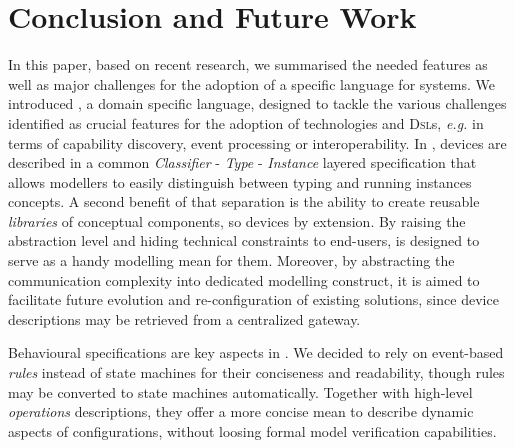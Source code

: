 \section{Conclusion and Future Work}
\label{sec:Conclusion}

In this paper, based on recent research, we summarised the needed features as well as major challenges for the adoption of a specific language for \IOT systems. We introduced \IOTDSL, a domain specific language, designed to tackle the various challenges identified as crucial features for the adoption of \IOT technologies and \textsc{Dsl}s, \textit{e.g.} in terms of capability discovery, event processing or interoperability. In \IOTDSL, devices are described in a common \textit{Classifier} - \textit{Type} - \textit{Instance} layered specification that allows modellers to easily distinguish between typing and running instances concepts. A second benefit of that separation is the ability to create reusable \textit{libraries} of conceptual components, so \IOT devices by extension. By raising the abstraction level and hiding technical constraints to end-users, \IOTDSL is designed to serve as a handy modelling mean for them. Moreover, by abstracting the communication complexity into dedicated modelling construct, it is aimed to facilitate future evolution and re-configuration of existing solutions, since device descriptions may be retrieved from a centralized gateway.

Behavioural specifications are key aspects in \IOTDSL. We decided to rely on event-based \textit{rules} instead of state machines for their conciseness and readability, though rules may be converted to state machines automatically. Together with high-level \textit{operations} descriptions, they offer a more concise mean to describe dynamic aspects of \IOT configurations, without loosing formal model verification capabilities.
